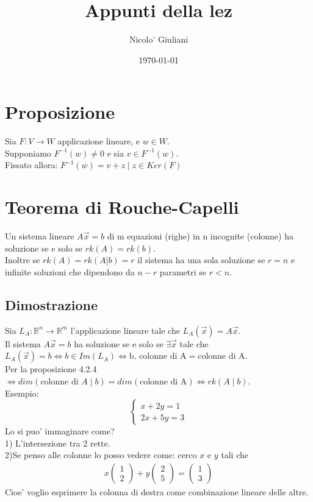 \documentclass[a4paper,12pt]{article}
\title{Appunti della lez}
\author{Nicolo' Giuliani}
\date{\today}
\begin{document}
\section{Proposizione}
Sia $F : V \to W$ applicazione lineare, e $w \in W$.
\\Supponiamo $F^{-1}(w)\neq 0$ e sia $v \in F^{-1}(w)$.
\\Fissato allora: $F^{-1}(w)={v+z \mid z \in Ker(F)}$
\section{Teorema di Rouche-Capelli}
Un sistema lineare $A\vec{x}=b$ di m equazioni (righe) in n incognite (colonne) ha soluzione se e solo se $rk(A)=rk(b)$.
\\Inoltre se $rk(A)=rk(A|b)=r$ il sistema ha una sola soluzione se $r=n$ e infinite soluzioni che dipendono da $n-r$ parametri se $r<n$.
\subsection{Dimostrazione}
Sia $L_A : \mathbb{R}^n \to \mathbb{R}^m$ l'applicazione lineare tale che $L_A(\vec{x})=A\vec{x}$.
\\Il sistema $A\vec{x}=b$ ha soluzione se e solo se $\exists \vec{x}$ tale che $L_A(\vec{x})=b \iff b\in Im(L_A) \iff \text{b, colonne di A} = \text{colonne di A}$.
\\Per la proposizione 4.2.4
\\$\iff dim(\text{colonne di $A\mid b $})=dim(\text{colonne di A}) \iff rk(A\mid b)$.
\\Esempio:
\begin{equation*}
    \begin{cases}
        x+2y=1 \\
        2x+5y=3
    \end{cases}
\end{equation*}
Lo si puo' immaginare come?
\\1) L'intersezione tra 2 rette.
\\2)Se penso alle colonne lo posso vedere come: cerco $x$ e $y$ tali che 
\begin{align*}
    x\begin{pmatrix}
        1 \\ 
        2
    \end{pmatrix}
    +y\begin{pmatrix}
        2 \\
        5
    \end{pmatrix}
    =\begin{pmatrix}
        1 \\ 
        3
    \end{pmatrix}
\end{align*}
Cioe' voglio esprimere la colonna di destra come combinazione lineare delle altre.
\end{document}

